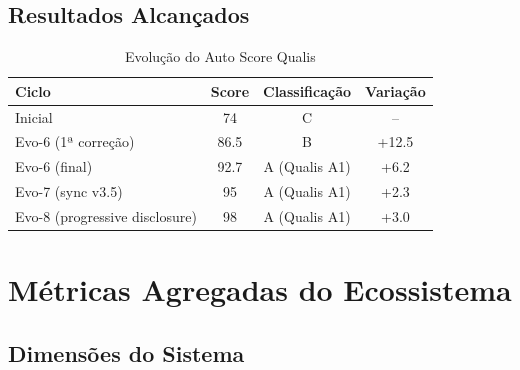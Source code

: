 \documentclass[12pt,a4paper,sumario=tradicional]{abntex2}
\begin{document}
\section{Resultados Alcançados}

\begin{longtable}{@{}lccc@{}}
\caption{Evolução do Auto Score Qualis}\\
\toprule
\textbf{Ciclo} & \textbf{Score} & \textbf{Classificação} & \textbf{Variação} \\
\midrule
Inicial & 74 & C & -- \\
Evo-6 (1ª correção) & 86.5 & B & +12.5 \\
Evo-6 (final) & 92.7 & A (Qualis A1) & +6.2 \\
Evo-7 (sync v3.5) & 95 & A (Qualis A1) & +2.3 \\
Evo-8 (progressive disclosure) & 98 & A (Qualis A1) & +3.0 \\
\bottomrule
\end{longtable}

\chapter{Métricas Agregadas do Ecossistema}

\section{Dimensões do Sistema}
\end{document}
